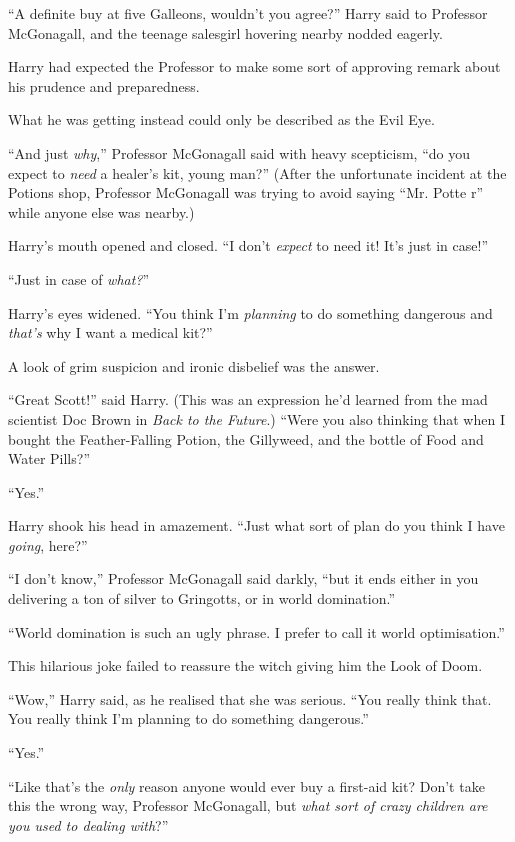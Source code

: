 ``A definite buy at five Galleons, wouldn't you agree?'' Harry said to Professor McGonagall, and the teenage salesgirl hovering nearby nodded eagerly.

Harry had expected the Professor to make some sort of approving remark about his prudence and preparedness.

What he was getting instead could only be described as the Evil Eye.

``And just \emph{why},'' Professor McGonagall said with heavy scepticism, ``do you expect to \emph{need} a healer's kit, young man?'' (After the unfortunate incident at the Potions shop, Professor McGonagall was trying to avoid saying ``Mr. Potte r'' while anyone else was nearby.)

Harry's mouth opened and closed. ``I don't \emph{expect} to need it! It's just in case!''

``Just in case of \emph{what?}''

Harry's eyes widened. ``You think I'm \emph{planning} to do something dangerous and \emph{that's} why I want a medical kit?''

A look of grim suspicion and ironic disbelief was the answer.

``Great Scott!'' said Harry. (This was an expression he'd learned from the mad scientist Doc Brown in \emph{Back to the Future}.) ``Were you also thinking that when I bought the Feather-Falling Potion, the Gillyweed, and the bottle of Food and Water Pills?''

``Yes.''

Harry shook his head in amazement. ``Just what sort of plan do you think I have \emph{going}, here?''

``I don't know,'' Professor McGonagall said darkly, ``but it ends either in you delivering a ton of silver to Gringotts, or in world domination.''

``World domination is such an ugly phrase. I prefer to call it world optimisation.''

This hilarious joke failed to reassure the witch giving him the Look of Doom.

``Wow,'' Harry said, as he realised that she was serious. ``You really think that. You really think I'm planning to do something dangerous.''

``Yes.''

``Like that's the \emph{only} reason anyone would ever buy a first-aid kit? Don't take this the wrong way, Professor McGonagall, but \emph{what sort of crazy children are you used to dealing with}?''

